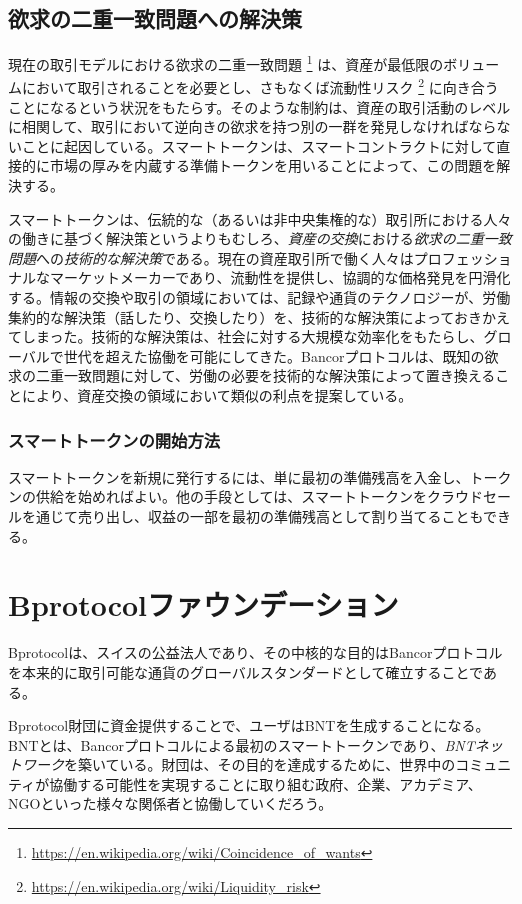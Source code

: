\documentclass{jsarticle}
\begin{document}
  \subsection{欲求の二重一致問題への解決策}

    現在の取引モデルにおける欲求の二重一致問題
    \footnote{\url{https://en.wikipedia.org/wiki/Coincidence_of_wants}}
    は、資産が最低限のボリュームにおいて取引されることを必要とし、さもなくば流動性リスク
    \footnote{\url{https://en.wikipedia.org/wiki/Liquidity_risk}} 
    に向き合うことになるという状況をもたらす。そのような制約は、資産の取引活動のレベルに相関して、取引において逆向きの欲求を持つ別の一群を発見しなければならないことに起因している。スマートトークンは、スマートコントラクトに対して直接的に市場の厚みを内蔵する準備トークンを用いることによって、この問題を解決する。

    スマートトークンは、伝統的な（あるいは非中央集権的な）取引所における人々の働きに基づく解決策というよりもむしろ、\emph{資産の交換}における\emph{欲求の二重一致問題}への\emph{技術的な解決策}である。現在の資産取引所で働く人々はプロフェッショナルなマーケットメーカーであり、流動性を提供し、協調的な価格発見を円滑化する。情報の交換や取引の領域においては、記録や通貨のテクノロジーが、労働集約的な解決策（話したり、交換したり）を、技術的な解決策によっておきかえてしまった。技術的な解決策は、社会に対する大規模な効率化をもたらし、グローバルで世代を超えた協働を可能にしてきた。Bancorプロトコルは、既知の欲求の二重一致問題に対して、労働の必要を技術的な解決策によって置き換えることにより、資産交換の領域において類似の利点を提案している。

    \subsubsection{スマートトークンの開始方法}

    スマートトークンを新規に発行するには、単に最初の準備残高を入金し、トークンの供給を始めればよい。他の手段としては、スマートトークンをクラウドセールを通じて売り出し、収益の一部を最初の準備残高として割り当てることもできる。

\section{Bprotocolファウンデーション}

Bprotocolは、スイスの公益法人であり、その中核的な目的はBancorプロトコルを本来的に取引可能な通貨のグローバルスタンダードとして確立することである。

Bprotocol財団に資金提供することで、ユーザはBNTを生成することになる。BNTとは、Bancorプロトコルによる最初のスマートトークンであり、\emph{BNTネットワーク}を築いている。財団は、その目的を達成するために、世界中のコミュニティが協働する可能性を実現することに取り組む政府、企業、アカデミア、NGOといった様々な関係者と協働していくだろう。
\end{document}

